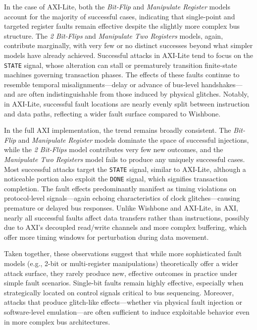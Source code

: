 In the case of AXI-Lite, both the \textit{Bit-Flip} and \textit{Manipulate Register} models account for the majority of successful cases, indicating that single-point and targeted register faults remain effective despite the slightly more complex bus structure. The \textit{2 Bit-Flips} and \textit{Manipulate Two Registers} models, again, contribute marginally, with very few or no distinct successes beyond what simpler models have already achieved. Successful attacks in AXI-Lite tend to focus on the \texttt{STATE} signal, whose alteration can stall or prematurely transition finite-state machines governing transaction phases. The effects of these faults continue to resemble temporal misalignments—delay or advance of bus-level handshakes—and are often indistinguishable from those induced by physical glitches. Notably, in AXI-Lite, successful fault locations are nearly evenly split between instruction and data paths, reflecting a wider fault surface compared to Wishbone.

In the full AXI implementation, the trend remains broadly consistent. The \textit{Bit-Flip} and \textit{Manipulate Register} models dominate the space of successful injections, while the \textit{2 Bit-Flips} model contributes very few new outcomes, and the \textit{Manipulate Two Registers} model fails to produce any uniquely successful cases. Most successful attacks target the \texttt{STATE} signal, similar to AXI-Lite, although a noticeable portion also exploit the \texttt{DONE} signal, which signifies transaction completion. The fault effects predominantly manifest as timing violations on protocol-level signals—again echoing characteristics of clock glitches—causing premature or delayed bus responses. Unlike Wishbone and AXI-Lite, in AXI, nearly all successful faults affect data transfers rather than instructions, possibly due to AXI’s decoupled read/write channels and more complex buffering, which offer more timing windows for perturbation during data movement.

Taken together, these observations suggest that while more sophisticated fault models (e.g., 2-bit or multi-register manipulations) theoretically offer a wider attack surface, they rarely produce new, effective outcomes in practice under simple fault scenarios. Single-bit faults remain highly effective, especially when strategically located on control signals critical to bus sequencing. Moreover, attacks that produce glitch-like effects—whether via physical fault injection or software-level emulation—are often sufficient to induce exploitable behavior even in more complex bus architectures.

